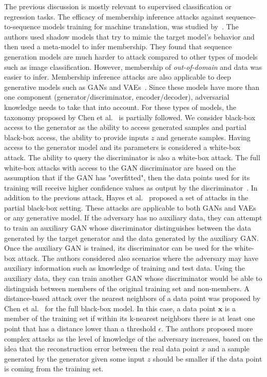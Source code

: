 The previous discussion is mostly relevant to supervised classification or regression tasks. The efficacy of membership inference attacks against sequence-to-sequence models training for machine translation, was studied by~. The authors used shadow models that try to mimic the target model's behavior and then used a meta-model to infer membership. They found that sequence generation models are much harder to attack compared to other types of models such as image classification. However, membership of \textit{out-of-domain} and  data was easier to infer. 
Membership inference attacks are also applicable to deep generative models such as GANs and VAEs~. Since these models have more than one component (generator/discriminator, encoder/decoder), adversarial knowledge needs to take that into account. For these types of models, the taxonomy proposed by Chen et al.~ is partially followed. We consider black-box access to the generator as the ability to access generated samples and partial black-box access, the ability to provide inputs $z$ and generate samples. Having access to the generator model and its parameters is considered a white-box attack. The ability to query the discriminator is also  a white-box attack. 
The full white-box attacks with access to the GAN discriminator are based on the assumption that if the GAN has "overfitted", then the data points used for its training will receive higher confidence values as output by the discriminator~. In addition to the previous attack, Hayes et al.~ proposed a set of attacks in the partial black-box setting. These attacks are applicable to both GANs and VAEs or any generative model. If the adversary has no auxiliary data, they can attempt to train an auxiliary GAN  whose discriminator distinguishes between the data generated by the target generator and the data generated by the auxiliary GAN. Once the auxiliary GAN is trained, its discriminator can be used for the white-box attack. The authors considered also scenarios where the adversary may have auxiliary information such as knowledge of training and test data. Using the auxiliary data, they can train another GAN whose discriminator would be able to distinguish between members of the original training set and non-members.  
A distance-based attack over the nearest neighbors of a data point was proposed by Chen et al.~ for the full black-box model. In this case, a data point $\mathbf{x}$ is a member of the training set if within its k-nearest neighbors there is at least one point that has a distance lower than a threshold $\epsilon$. The authors proposed more complex attacks as the level of knowledge of the adversary increases, based on the idea that the reconstruction error between the real data point $x$ and a sample generated by the generator given some input $z$ should be smaller if the data point is coming from the training set.

